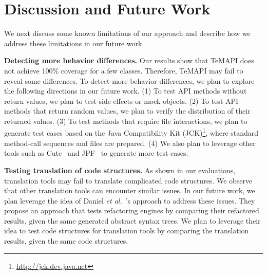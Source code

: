 

\section{Discussion and Future Work}
\label{sec:discuss}

We next discuss some known limitations of our approach and describe how we address these limitations in our future work.

\textbf{Detecting more behavior differences.} Our results show that TeMAPI does not achieve 100\% coverage for a few classes. Therefore, TeMAPI may fail to reveal some differences. To detect more behavior differences, we plan to explore the following directions in our future work. (1) To test API methods without return values, we plan to test side effects or mock objects. (2) To test API methods that return random values, we plan to verify the distribution of their returned values. (3) To test methods that require file interactions, we plan to generate test cases based on the Java Compatibility Kit (JCK)\footnote{\url{http://jck.dev.java.net}}, where standard method-call sequences and files are prepared. (4) We also plan to leverage other tools such as Cute~\cite{koushik:cute} and JPF~\cite{visser2003mcp} to generate more test cases.

\textbf{Testing translation of code structures.} As shown in our evaluations, translation tools may fail to translate complicated code structures. We observe that other translation tools can encounter similar issues. In our future work, we plan leverage the idea of Daniel \emph{et al.}~\cite{daniel2007automated}'s approach to address these issues. They propose an approach that tests refactoring engines by comparing their refactored results, given the same generated abstract syntax trees. We plan to leverage their idea to test code structures for translation tools by comparing the translation results, given the same code structures.

